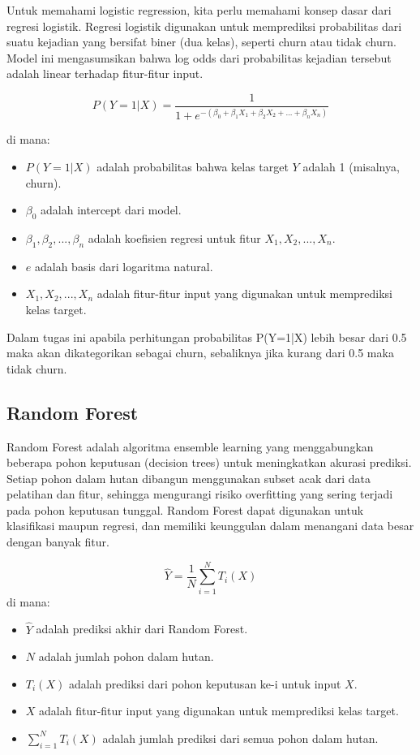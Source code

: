 Untuk memahami logistic regression, kita perlu memahami konsep dasar dari regresi logistik. Regresi logistik digunakan untuk memprediksi probabilitas dari suatu kejadian yang bersifat biner (dua kelas), seperti churn atau tidak churn. Model ini mengasumsikan bahwa log odds dari probabilitas kejadian tersebut adalah linear terhadap fitur-fitur input.

\begin{equation}
    P(Y=1|X) = \frac{1}{1 + e^{-(\beta_0 + \beta_1 X_1 + \beta_2 X_2 + ... + \beta_n X_n)}}
\end{equation}

di mana:
\begin{itemize}
    \item \( P(Y=1|X) \) adalah probabilitas bahwa kelas target \( Y \) adalah 1 (misalnya, churn).
    \item \( \beta_0 \) adalah intercept dari model.
    \item \( \beta_1, \beta_2, ..., \beta_n \) adalah koefisien regresi untuk fitur \( X_1, X_2, ..., X_n \).
    \item \( e \) adalah basis dari logaritma natural.
    \item \( X_1, X_2, ..., X_n \) adalah fitur-fitur input yang digunakan untuk memprediksi kelas target.
\end{itemize}

Dalam tugas ini apabila perhitungan probabilitas P(Y=1|X) lebih besar dari 0.5 maka akan dikategorikan sebagai churn, sebaliknya jika kurang dari 0.5 maka tidak churn.

\subsection{Random Forest}
Random Forest adalah algoritma ensemble learning yang menggabungkan beberapa pohon keputusan (decision trees) untuk meningkatkan akurasi prediksi. Setiap pohon dalam hutan dibangun menggunakan subset acak dari data pelatihan dan fitur, sehingga mengurangi risiko overfitting yang sering terjadi pada pohon keputusan tunggal. Random Forest dapat digunakan untuk klasifikasi maupun regresi, dan memiliki keunggulan dalam menangani data besar dengan banyak fitur.

\begin{equation}
    \hat{Y} = \frac{1}{N} \sum_{i=1}^{N} T_i(X)
\end{equation}
di mana:
\begin{itemize}
    \item \( \hat{Y} \) adalah prediksi akhir dari Random Forest.
    \item \( N \) adalah jumlah pohon dalam hutan.
    \item \( T_i(X) \) adalah prediksi dari pohon keputusan ke-i untuk input \( X \).
    \item \( X \) adalah fitur-fitur input yang digunakan untuk memprediksi kelas target.
    \item \( \sum_{i=1}^{N} T_i(X) \) adalah jumlah prediksi dari semua pohon dalam hutan.
\end{itemize}

